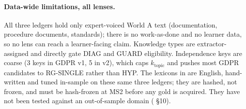 \paragraph{Data-wide limitations, all lenses.} All three ledgers hold only expert-voiced World A
text (documentation, procedure documents, standards); there is no work-as-done and no learner
data, so no lens can reach a learner-facing claim. Knowledge types are extractor-assigned and
directly gate DIAG and GUARD eligibility. Independence keys are coarse (3 keys in GDPR v1, 5 in
v2), which caps $k_{\text{topic}}$ and pushes most GDPR candidates to RG-SINGLE rather than HYP.
The lexicons in  are English, hand-written and tuned in-sample
on these same three ledgers; they are hashed, not frozen, and must be hash-frozen at MS2 before
any gold is acquired. They have not been tested against an out-of-sample domain ( \S10).
